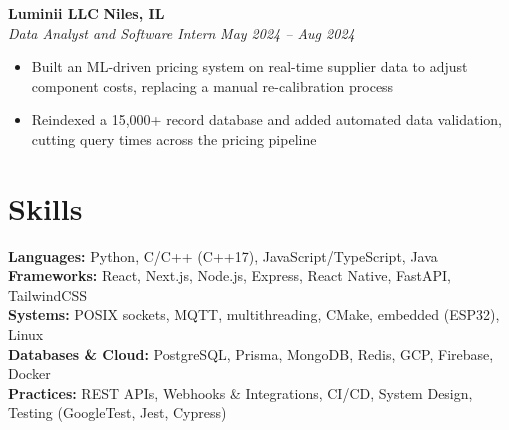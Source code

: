 \documentclass[10pt,letterpaper]{article}
\begin{document}
\vspace{0.2em}
\noindent\textbf{Luminii LLC} \hfill \textbf{Niles, IL}\\
\textit{Data Analyst and Software Intern} \hfill \textit{May 2024 -- Aug 2024}
\begin{itemize}
  \item Built an ML-driven pricing system on real-time supplier data to adjust component costs, replacing a manual re-calibration process
  \item Reindexed a 15,000+ record database and added automated data validation, cutting query times across the pricing pipeline
\end{itemize}

\section*{Skills}
\noindent\textbf{Languages:} Python, C/C++ (C++17), JavaScript/TypeScript, Java\\
\textbf{Frameworks:} React, Next.js, Node.js, Express, React Native, FastAPI, TailwindCSS\\
\textbf{Systems:} POSIX sockets, MQTT, multithreading, CMake, embedded (ESP32), Linux\\
\textbf{Databases \& Cloud:} PostgreSQL, Prisma, MongoDB, Redis, GCP, Firebase, Docker\\
\textbf{Practices:} REST APIs, Webhooks \& Integrations, CI/CD, System Design, Testing (GoogleTest, Jest, Cypress)
\end{document}

